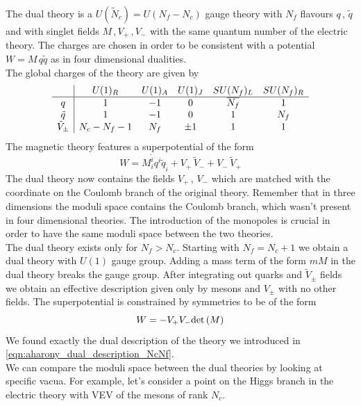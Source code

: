 The dual theory is a $U(\tilde{N}_c) = U(N_f - N_c) $ gauge theory with $N_f$ flavours $q\, ,\, \tilde{q}$ and with singlet fields  $M \,,  V_+ \, , V_-$ with the same quantum number of the electric theory. 
The charges are chosen in order to be consistent with a potential $W = M \, q \tilde{q}$ as in four dimensional dualities.\\
The global charges of the theory are given by
\begin{equation}
\begin{array}{ c | c c c c c}
  & U(1)_R & U(1)_A & U(1)_J  & SU(N_f)_L & SU(N_f)_R \\
 \hline
 q & 1 & -1 & 0 & \overline{N_f} & 1 \\  
 \tilde{q}& 1  & -1 & 0  & 1 & {N_f}  \\  
 \tilde{V}_{\pm} & N_c - N_f -1 & N_f  & \pm 1 &  1 & 1 \\
\end{array}
\end{equation}
The magnetic theory features a superpotential of the form
\begin{equation}
W = M^{\tilde{i}}_i q^i \tilde{q}_{\tilde{i}} + V_+ \, \tilde{V}_- + V_- \, \tilde{V}_+
\label{eqn:aharony_mag_superpotential}
\end{equation}
The dual theory now contains the fields $V_+ \, , \, V_-$ which are matched with the coordinate on the Coulomb branch of the original theory.
Remember that in three dimensions the moduli space contains the Coulomb branch, which wasn't present in four dimensional theories.
The introduction of the monopoles is crucial in order to have the same moduli space between the two theories.\\
The dual theory exists only for $N_f > N_c$. 
Starting with $N_f =N_c + 1$ we obtain a dual theory with $U(1)$ gauge group. Adding a mass term of the form $m M$ in the dual theory breaks the gauge group. After integrating out quarks and $\tilde{V}_{\pm}$ fields we obtain an effective description given only by mesons and $V_{\pm}$ with no other fields.
The superpotential is constrained by symmetries to be of the form 
\begin{equation}
W = - V_+ V_- \mathrm{det } \,{(M)}
\end{equation}
We found exactly the dual description of the theory we introduced in \eqref{eqn:aharony_dual_description_NcNf}.
\\
We can compare the moduli space between the dual theories by looking at specific vacua.
For example, let's consider a point on the Higgs branch in the electric theory with  VEV of the mesons of rank $N_c$.
